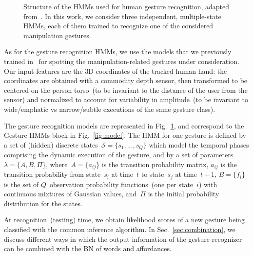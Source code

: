 \newcommand{\modeltwo}{
}

\begin{figure}
  \centering
  \modeltwo
  \caption{Structure of the \acp{HMM} used for human gesture recognition, adapted from~\cite{saponaro:2013:crhri}. In this work, we consider three independent, multiple-state \acp{HMM}, each of them trained to recognize one of the considered manipulation gestures.}
  \label{fig:hmms}
\end{figure}

As for the gesture recognition \acsp{HMM}, we use the models that we previously trained in~\cite{saponaro:2013:crhri} for spotting the manipulation-related gestures under consideration. Our input features are the 3D coordinates of the tracked human hand: the coordinates are obtained with a commodity depth sensor, then transformed to be centered on the person torso~(to be invariant to the distance of the user from the sensor) and normalized to account for variability in amplitude~(to be invariant to wide/emphatic vs narrow/subtle executions of the same gesture class).

The gesture recognition models are represented in Fig.~\ref{fig:hmms}, and correspond to the Gesture \acp{HMM} block in Fig.~\ref{fig:model}. The \ac{HMM} for one gesture is defined by a set of (hidden) discrete states~$\mathcal{S} = \{s_1, \dots, s_Q\}$ which model the temporal phases comprising the dynamic execution of the gesture, and by a set of parameters~$\lambda = \{ A, B, \Pi \}$, where~$A = \{ a_{ij} \}$ is the transition probability matrix, $a_{ij}$ is the transition probability from state~$s_i$ at time~$t$ to state~$s_j$ at time~$t+1$, $B = \{ f_i \}$ is the set of $Q$~observation probability functions~(one per state~$i$) with continuous mixtures of Gaussian values, and~$\Pi$ is the initial probability distribution for the states.

At recognition~(testing) time, we obtain likelihood scores of a new gesture being classified with the common \FB{} inference algorithm. In Sec.~\ref{sec:combination}, we discuss different ways in which the output information of the gesture recognizer can be combined with the \acl{BN} of words and affordances.

